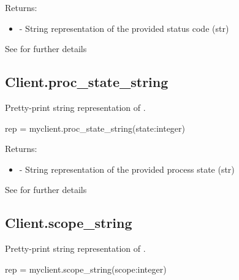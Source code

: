 Returns:
\begin{itemize}
    \item {} - String representation of the provided status code (str)
\end{itemize}

See  for further details


\subsection{Client.proc_state_string}

\summary

Pretty-print string representation of .

\format

\pyspecificstart
\begin{codepar}
rep = myclient.proc_state_string(state:integer)
\end{codepar}
\pyspecificend

\begin{arglist}
\end{arglist}

Returns:
\begin{itemize}
    \item {} - String representation of the provided process state (str)
\end{itemize}

See  for further details


\subsection{Client.scope_string}

\summary

Pretty-print string representation of .

\format

\pyspecificstart
\begin{codepar}
rep = myclient.scope_string(scope:integer)
\end{codepar}
\pyspecificend

\begin{arglist}
\end{arglist}

